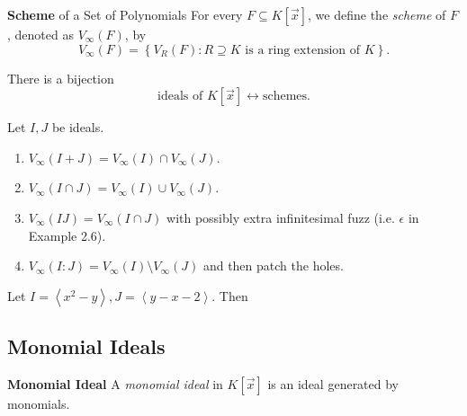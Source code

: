 \documentclass[co439]{subfiles}
\begin{document}
    \rruleline

    \begin{definition}{\textbf{Scheme} of a Set of Polynomials}
        For every $F\subseteq K\left[ \vec{x} \right]$, we define the \emph{scheme} of $F$, denoted as $V_{\infty}\left( F \right)$, by
        \begin{equation*}
            V_{\infty}\left( F \right) = \left\lbrace V_R\left( F \right) : \text{$R\supseteq K$ is a ring extension of $K$} \right\rbrace.
        \end{equation*}
    \end{definition}
    
    \begin{theorem}{}
        There is a bijection
        \begin{equation*}
            \text{ideals of $K\left[ \vec{x} \right]$} \leftrightarrow \text{schemes}.
        \end{equation*}
    \end{theorem}

    \rruleline
    
    \np Let $I,J$ be ideals.
    \begin{enumerate}
        \item $V_{\infty}\left( I+J \right) = V_{\infty}\left( I \right) \cap V_{\infty}\left( J \right)$.
        \item $V_{\infty}\left( I\cap J \right) = V_{\infty}\left( I \right) \cup V_{\infty}\left( J \right)$.
        \item $V_{\infty}\left( IJ \right) = V_{\infty}\left( I\cap J \right)$ with possibly extra infinitesimal fuzz (i.e. $\epsilon$ in Example 2.6).
        \item $V_{\infty}\left( I:J \right) = V_{\infty}\left( I \right) \setminus V_{\infty}\left( J \right)$ and then patch the holes.
    \end{enumerate}
    
    \begin{example}{}
        Let $I = \left< x^{2}-y \right>, J = \left< y-x-2 \right>$. Then
    \end{example}

    \rruleline

    \subsection{Monomial Ideals}
    
    \begin{definition}{\textbf{Monomial Ideal}}
        A \emph{monomial ideal} in $K\left[ \vec{x} \right]$ is an ideal generated by monomials.
    \end{definition}
\end{document}
